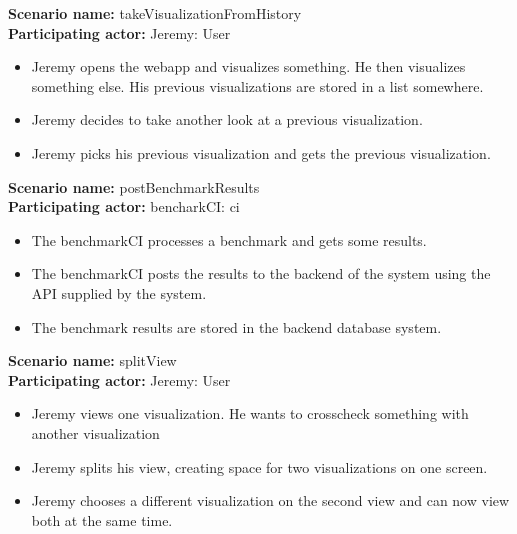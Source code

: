 \documentclass[parskip=full,11pt]{scrartcl}
\begin{document}
\textbf{Scenario name:} takeVisualizationFromHistory \\
\textbf{Participating actor:} Jeremy: User
\begin{itemize}
	\item Jeremy opens the webapp and visualizes something. He then visualizes something else. His previous visualizations are stored in a list somewhere.
	\item Jeremy decides to take another look at a previous visualization.
	\item Jeremy picks his previous visualization and gets the previous visualization.
\end{itemize}

\textbf{Scenario name:} postBenchmarkResults \\
\textbf{Participating actor:} bencharkCI: \acrshort{ci}
\begin{itemize}
	\item The benchmarkCI processes a benchmark and gets some results.
	\item The benchmarkCI posts the results to the backend of the system using the API supplied by the system.
	\item The benchmark results are stored in the backend database system.
\end{itemize}

\textbf{Scenario name:} splitView \\
\textbf{Participating actor:} Jeremy: User
\begin{itemize}
	\item Jeremy views one visualization. He wants to crosscheck something with another visualization
	\item Jeremy splits his view, creating space for two visualizations on one screen.
	\item Jeremy chooses a different visualization on the second view and can now view both at the same time.
\end{itemize}

\appendix


\printnoidxglossaries
\end{document}
